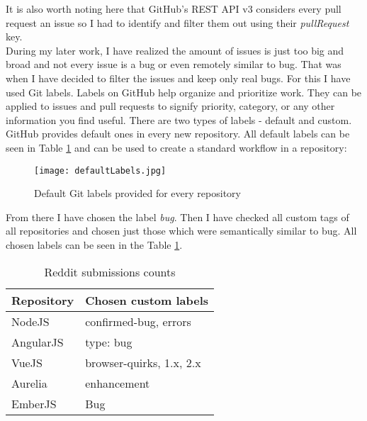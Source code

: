 It is also worth noting here that GitHub's REST API v3 considers every pull request an issue so I had to identify and filter them out using their \textit{pullRequest} key.\\
During my later work, I have realized the amount of issues is just too big and broad and not every issue is a bug or even remotely similar to bug. That was when I have decided to filter the issues and keep only real bugs. For this I have used Git labels. Labels on GitHub help organize and prioritize work. They can be applied to issues and pull requests to signify priority, category, or any other information you find useful. There are two types of labels - default and custom. GitHub provides default ones in every new repository. All default labels can be seen in Table \ref{fig:defaultLabels} and can be used to create a standard workflow in a repository:

\begin{figure}[H]%
    \centering
	\texttt{[image: defaultLabels.jpg]}
    \caption{Default Git labels provided for every repository}%
    \label{fig:defaultLabels}%
\end{figure}

From there I have chosen the label \textit{bug}. Then I have checked all custom tags of all repositories and chosen just those which were semantically similar to bug. All chosen labels can be seen in the Table \ref{table:allGitBugLabels}.


\begin{table}[H]
\centering
\begin{tabular}{ |p{3cm}||p{6cm}|}
 \hline
\textbf{ Repository }& \textbf{Chosen custom labels}\\
 \hline
 NodeJS   & confirmed-bug, errors \\ \hline
 AngularJS &   type: bug \\ \hline
 VueJS & browser-quirks, 1.x, 2.x\\ \hline
 Aurelia & enhancement\\ \hline
 EmberJS & Bug\\ \hline
\end{tabular}
\caption{Reddit submissions counts}
\label{table:allGitBugLabels}
\end{table}
